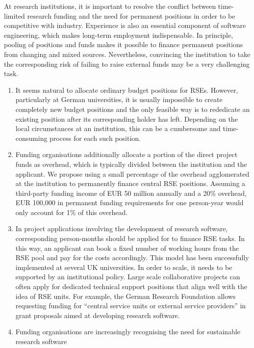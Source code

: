 \documentclass[a4paper]{article}
\begin{document}
At research institutions, it is important to resolve the conflict between time-limited research funding and the need for permanent positions in order to be competitive with industry.
Experience is also an essential component of software engineering, which makes long-term employment indispensable.
In principle, pooling of positions and funds makes it possible to finance permanent positions from changing and mixed sources.
Nevertheless, convincing the institution to take the corresponding risk of failing to raise external funds may be a very challenging task.
\begin{enumerate}
\item It seems natural to allocate ordinary budget positions for RSEs.
      However, particularly at German universities, it is usually impossible to create completely new budget positions and the only feasible way is to rededicate an existing position after its corresponding holder has left.
      Depending on the local circumstances at an institution, this can be a cumbersome and time-consuming process for each such position.
\item Funding organisations additionally allocate a portion of the direct project funds as overhead, which is typically divided between the institution and the applicant.
      We propose using a small percentage of the overhead agglomerated at the institution to permanently finance central RSE positions.
      Assuming a third-party funding income of EUR 50 million annually and a 20\% overhead, EUR 100,000 in permanent funding requirements for one person-year would only account for 1\% of this overhead.
\item In project applications involving the development of research software, corresponding person-months should be applied for to finance RSE tasks.
      In this way, an applicant can book a fixed number of working hours from the RSE pool and pay for the costs accordingly.
      This model has been successfully implemented at several UK universities.
      In order to scale, it needs to be supported by an institutional policy.
      Large scale collaborative projects can often apply for dedicated technical support positions that align well with the idea of RSE units.
      For example, the German Research Foundation allows requesting funding for “central service units or external service providers” in grant proposals aimed at developing research software\autocite{katerbow_dfg_rse_2024}.
\item Funding organisations are increasingly recognising the need for sustainable research software

\end{enumerate}
\end{document}
